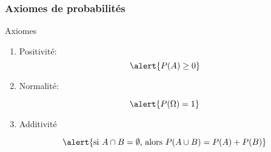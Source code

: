 \documentclass{beamer}
\begin{document}
\begin{frame}[t]
    \frametitle{Axiomes de probabilités}
           \begin{block}{Axiomes}
               
               \begin{enumerate}
                   \small
                   \item Positivité:
                       \begin{equation}
                          \alert{P(A) \geq 0} 
                       \end{equation}
                    \item Normalité:

                       \begin{equation}
                          \alert{P(\Omega) = 1} 
                       \end{equation}

                   \item Additivité

                       \begin{equation}
                           \alert{
                           \text{si } A \cap B = \emptyset \text{, alors }
                           P(A\cup B) = P(A) + P(B)}
                       \end{equation}
               \end{enumerate}
           \end{block}
           
\end{frame}
\end{document}
